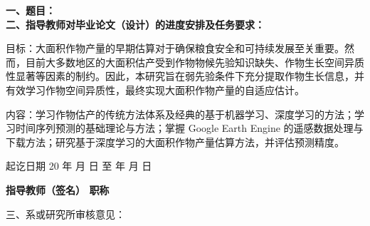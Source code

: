 \cleardoublepage{}

{
    \bfseries
    \noindent 一、题目：\\
    \noindent 二、指导教师对毕业论文（设计）的进度安排及任务要求：\\

    \par 目标：大面积作物产量的早期估算对于确保粮食安全和可持续发展至关重要。然而，目前大多数地区的大面积估产受到作物物候先验知识缺失、作物生长空间异质性显著等因素的制约。因此，本研究旨在弱先验条件下充分提取作物生长信息，并有效学习作物空间异质性，最终实现大面积作物产量的自适应估计。
    
    \par 内容：学习作物估产的传统方法体系及经典的基于机器学习、深度学习的方法；学习时间序列预测的基础理论与方法；掌握 Google Earth Engine 的遥感数据处理与下载方法；研究基于深度学习的大面积作物产量估算方法，并评估预测精度。

    \vskip 20mm

    \noindent 起讫日期 20 \quad 年 \quad  月 \quad  日 \quad 至  \quad  年 \quad  月  \quad 日
    \begin{flushright}
        \bfseries {}
            指导教师（签名） \underline{} 职称 \underline{}
    \end{flushright}

    \noindent 三、系或研究所审核意见：\\

    \mbox{} \vfill
    \signature{负责人（签名）}
}
